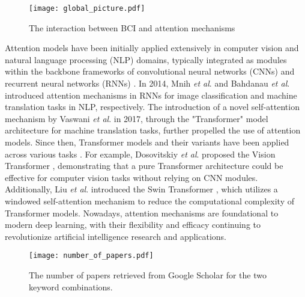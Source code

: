 \documentclass[preprint,12pt]{elsarticle}
\newcommand{\etal}{\textit{et al}. }
\begin{document}
\begin{figure*}
\begin{center}
\texttt{[image: global\_picture.pdf]}
\end{center}
\caption{The interaction between BCI and attention mechanisms}
\label{fig:global_picture}
\end{figure*}

Attention models have been initially applied extensively in computer vision and natural language processing (NLP) domains, typically integrated as modules within the backbone frameworks of convolutional neural networks (CNNs) and recurrent neural networks (RNNs) \cite{xie2023attention}. In 2014, Mnih \etal \cite{mnih2014recurrent} and Bahdanau \etal \cite{bahdanau2014neural} introduced attention mechanisms in RNNs for image classification and machine translation tasks in NLP, respectively. The introduction of a novel self-attention mechanism by Vaswani \etal \cite{vaswani2017attention} in 2017, through the "Transformer" model architecture for machine translation tasks, further propelled the use of attention models. Since then, Transformer models and their variants have been applied across various tasks \cite{islam2023comprehensive}. For example, Dosovitskiy \etal proposed the Vision Transformer \cite{dosovitskiy2020image}, demonstrating that a pure Transformer architecture could be effective for computer vision tasks without relying on CNN modules. Additionally, Liu \etal introduced the Swin Transformer \cite{liu2021swin}, which utilizes a windowed self-attention mechanism to reduce the computational complexity of Transformer models. Nowadays, attention mechanisms are foundational to modern deep learning, with their flexibility and efficacy continuing to revolutionize artificial intelligence research and applications.

\begin{figure*}
\begin{center}
\texttt{[image: number\_of\_papers.pdf]}
\end{center}
\caption{The number of papers retrieved from Google Scholar for the two keyword combinations.}
\label{fig:papers}
\end{figure*}
\end{document}
